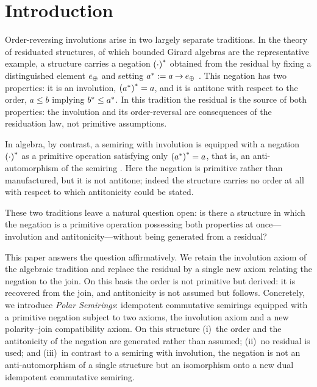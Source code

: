 
\section{Introduction}\label{sec:intro}

Order-reversing involutions arise in two largely separate traditions. In the
theory of residuated structures, of which bounded Girard algebras are the
representative example, a structure carries a negation ${(\cdot)}^{*}$
obtained from the residual by fixing a distinguished element $e_{\oplus}$ and setting
${a}^{*} := a \mathbin{\to} e_{\oplus}$ \citep{Rosenthal1990,Agliano2025}. This negation has
two properties: it is an involution, ${({a}^{*})}^{*} = a$, and it is
antitone with respect to the order, $a \leq b$ implying
${b}^{*} \leq {a}^{*}$. In this tradition the residual is the source of
both properties: the involution and its order-reversal are consequences of the
residuation law, not primitive assumptions.

In algebra, by contrast, a semiring with involution is equipped with a negation
${(\cdot)}^{*}$ as a primitive operation satisfying only
${({a}^{*})}^{*} = a$, that is, an anti-automorphism of the semiring
\citep{Golan1999,dolinka2000minimal}. Here the negation is primitive rather than
manufactured, but it is not antitone; indeed the structure carries no order at
all with respect to which antitonicity could be stated.

These two traditions leave a natural question open: is there a structure in
which the negation is a primitive operation possessing both properties at
once---involution and antitonicity---without being generated from a residual?

This paper answers the question affirmatively. We retain the involution axiom
of the algebraic tradition and replace the residual by a single new axiom
relating the negation to the join. On this basis the order is not primitive but
derived: it is recovered from the join, and antitonicity is not assumed but
follows. Concretely, we introduce \emph{Polar Semirings}: idempotent
commutative semirings equipped with a primitive negation subject to two axioms,
the involution axiom and a new polarity--join compatibility axiom. On this
structure (i)~the order and the antitonicity of the negation are generated
rather than assumed; (ii)~no residual is used; and (iii)~in contrast to a
semiring with involution, the negation is not an anti-automorphism of a single
structure but an isomorphism onto a new dual idempotent commutative semiring.

